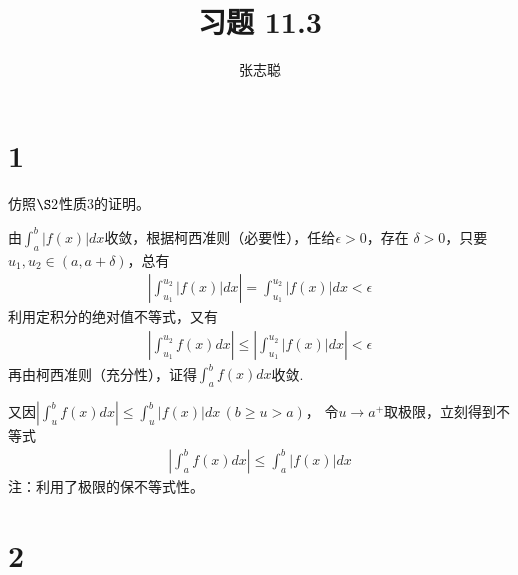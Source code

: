 \documentclass{article}
\begin{document}
\title{习题 11.3}
\author{张志聪}
\maketitle

\section*{1}

仿照$\S 2$性质3的证明。

由$\int_{a}^{b} |f(x)| dx$收敛，根据柯西准则（必要性），任给$\epsilon > 0$，存在
$\delta > 0$，只要$u_1, u_2 \in (a, a+\delta)$，总有
\begin{align*}
  \left| \int_{u_1}^{u_2} |f(x)| dx \right| = \int_{u_1}^{u_2} |f(x)| dx < \epsilon
\end{align*}
利用定积分的绝对值不等式，又有
\begin{align*}
  \left| \int_{u_1}^{u_2} f(x) dx \right| \leq \left| \int_{u_1}^{u_2} |f(x)| dx \right| < \epsilon
\end{align*}
再由柯西准则（充分性），证得$\int_{a}^{b} f(x) dx$收敛.

又因$\left| \int_{u}^{b} f(x) dx \right| \leq \int_{u}^{b} |f(x)| dx \, (b \geq u > a)$，
令$u \to a^+$取极限，立刻得到不等式
\begin{align*}
  \left| \int_{a}^{b} f(x) dx \right| \leq \int_{a}^{b} |f(x)| dx
\end{align*}
注：利用了极限的保不等式性。

\section*{2}
\end{document}
